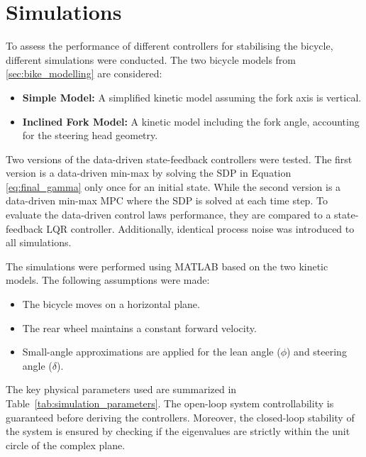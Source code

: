 \chapter{Simulations}
\label{chap:simulations}

To assess the performance of different controllers for stabilising the bicycle, different simulations were conducted.
The two bicycle models from \autoref{sec:bike_modelling} are considered:
\begin{itemize}
	\item \textbf{Simple Model:} A simplified kinetic model assuming the fork axis is vertical.
	\item \textbf{Inclined Fork Model:} A kinetic model including the fork angle, accounting for the steering head geometry.
\end{itemize}


Two versions of the data-driven state-feedback controllers were tested. The first version is a data-driven min-max by solving the SDP in Equation \eqref{eq:final_gamma} only once for an initial state. While the second version is a data-driven min-max MPC where the SDP is solved at each time step. To evaluate the data-driven control laws performance, they are compared to a state-feedback LQR controller. Additionally, identical process noise was introduced to all simulations.

The simulations were performed using MATLAB based on the two kinetic models.
The following assumptions were made:
\begin{itemize}
	\item The bicycle moves on a horizontal plane.
	\item The rear wheel maintains a constant forward velocity.
	\item Small-angle approximations are applied for the lean angle ($\phi$) and steering angle ($\delta$).
\end{itemize}

The key physical parameters used are summarized in Table~\ref{tab:simulation_parameters}. The open-loop system controllability is guaranteed before deriving the controllers. Moreover, the closed-loop stability of the system is ensured by checking if the eigenvalues are strictly within the unit circle of the complex plane.

